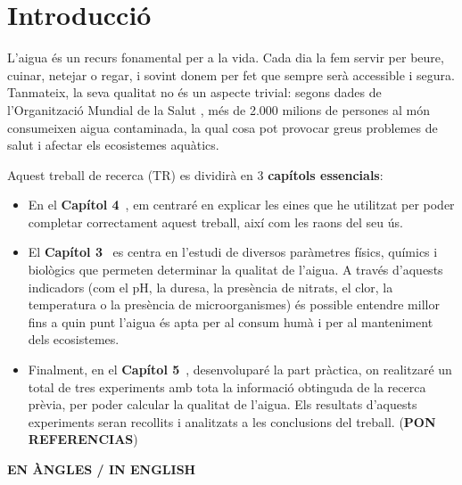 \chapter{Introducció}

L’aigua és un recurs fonamental per a la vida. Cada dia la fem servir per beure, cuinar, netejar o regar, i sovint donem per fet que sempre serà accessible i segura. Tanmateix, la seva qualitat no és un aspecte trivial: segons dades de l’Organització Mundial de la Salut \cite{OrgaMS}, més de 2.000 milions de persones al món consumeixen aigua contaminada, la qual cosa pot provocar greus problemes de salut i afectar els ecosistemes aquàtics.

Aquest treball de recerca (TR) es dividirà en 3 \textbf{capítols essencials}:

\begin{itemize}
  \item En el \textbf{Capítol 4}~, em centraré en explicar les eines que he utilitzat per poder completar correctament aquest treball, així com les raons del seu ús.

  \item El \textbf{Capítol 3}~ es centra en l’estudi de diversos paràmetres físics, químics i biològics que permeten determinar la qualitat de l’aigua. A través d’aquests indicadors (com el pH, la duresa, la presència de nitrats, el clor, la temperatura o la presència de microorganismes) és possible entendre millor fins a quin punt l’aigua és apta per al consum humà i per al manteniment dels ecosistemes.

  \item Finalment, en el \textbf{Capítol 5}~, desenvoluparé la part pràctica, on realitzaré un total de tres experiments amb tota la informació obtinguda de la recerca prèvia, per poder calcular la qualitat de l’aigua. Els resultats d’aquests experiments seran recollits i analitzats a les conclusions del treball. (\textbf{PON REFERENCIAS})
\end{itemize}

\textbf{EN ÀNGLES / IN ENGLISH}


